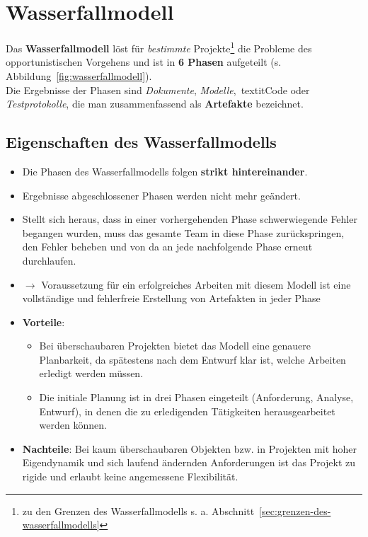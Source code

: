 \section{Wasserfallmodell}

Das \textbf{Wasserfallmodell} löst für \textit{bestimmte} Projekte\footnote{
zu den Grenzen des Wasserfallmodells s. a. Abschnitt~\ref{sec:grenzen-des-wasserfallmodells}
} die Probleme des opportunistischen Vorgehens und ist in \textbf{6 Phasen} aufgeteilt (s. Abbildung~\ref{fig:wasserfallmodell}).\\
Die Ergebnisse der Phasen sind \textit{Dokumente}, \textit{Modelle},\ textit{Code} oder \textit{Testprotokolle}, die man zusammenfassend als \textbf{Artefakte} bezeichnet.\\

\subsection*{Eigenschaften des Wasserfallmodells}
\begin{itemize}
    \item Die Phasen des Wasserfallmodells folgen \textbf{strikt hintereinander}.
    \item Ergebnisse abgeschlossener Phasen werden nicht mehr geändert.
    \item Stellt sich heraus, dass in einer vorhergehenden Phase schwerwiegende Fehler begangen wurden, muss das gesamte Team in diese Phase zurückspringen, den Fehler beheben und von da an jede nachfolgende Phase erneut durchlaufen.
    \item[] $\rightarrow$ Voraussetzung für ein erfolgreiches Arbeiten mit diesem Modell ist eine vollständige und fehlerfreie Erstellung von Artefakten in jeder Phase
    \item \textbf{Vorteile}:
        \begin{itemize}
            \item Bei überschaubaren Projekten bietet das Modell eine genauere Planbarkeit, da spätestens nach dem Entwurf klar ist, welche Arbeiten erledigt werden müssen.
            \item Die initiale Planung ist in drei Phasen eingeteilt (Anforderung, Analyse, Entwurf), in denen die zu erledigenden Tätigkeiten herausgearbeitet werden können.
        \end{itemize}
    \item \textbf{Nachteile}: Bei kaum überschaubaren Objekten bzw. in Projekten mit hoher Eigendynamik und sich laufend ändernden Anforderungen ist das Projekt zu rigide und erlaubt keine angemessene Flexibilität.
\end{itemize}



